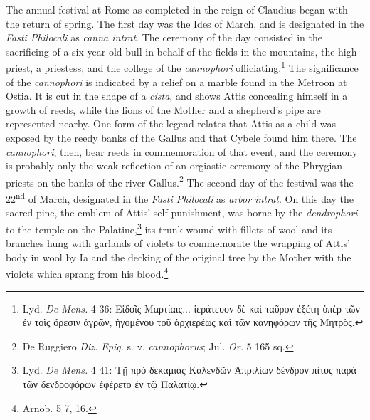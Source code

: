 \documentclass[a4paper, 11pt, oneside, polutonikogreek, english]{article}
\begin{document}
The annual festival at Rome as completed in the reign of Claudius began with the return of spring. The first day was the Ides of March, and is designated in the \emph{Fasti Philocali} as \emph{canna intrat}. The ceremony of the day consisted in the sacrificing of a six-year-old bull in behalf of the fields in the mountains, the high priest, a priestess, and the college of the \emph{cannophori} officiating.\footnote{Lyd. \emph{De Mens.} 4 36: Εἰδοῖς Μαρτίαις... ἱεράτευον δὲ καὶ ταῦρον ἑξέτη ὑπὲρ τῶν ἐν τοὶς ὄρεσιν ἀγρῶν, ἡγομένου τοῦ ἀρχιερέως καὶ τῶν κανηφόρων τῆς Μητρὸς.} The significance of the \emph{cannophori} is indicated by a relief on a marble found in the Metroon at Ostia. It is cut in the shape of a \emph{cista}, and shows Attis concealing himself in a growth of reeds, while the lions of the Mother and a shepherd's pipe are represented nearby. One form of the legend relates that Attis as a child was exposed by the reedy banks of the Gallus and that Cybele found him there. The \emph{cannophori}, then, bear reeds in commemoration of that event, and the ceremony is probably only the weak reflection of an orgiastic ceremony of the Phrygian priests on the banks of the river Gallus.\footnote{De Ruggiero \emph{Diz. Epig.} s. v. \emph{cannophorus}; Jul. \emph{Or.} 5 165 sq.} The second day of the festival was the 22\textsuperscript{nd} of March, designated in the \emph{Fasti Philocali} as \emph{arbor intrat}. On this day the sacred pine, the emblem of Attis' self-punishment, was borne by the \emph{dendrophori} to the temple on the Palatine,\footnote{Lyd. \emph{De Mens.} 4 41: Τῇ πρὸ δεκαμιὰς Καλενδῶν Ἀπριλίων δὲνδρον πίτυς παρὰ τῶν δενδροφόρων ἐφέρετο ἐν τῷ Παλατίῳ.} its trunk wound with fillets of wool and its branches hung with garlands of violets to commemorate the wrapping of Attis' body in wool by Ia and the decking of the original tree by the Mother with the violets which sprang from his blood.\footnote{Arnob. 5 7, 16.}
\end{document}
